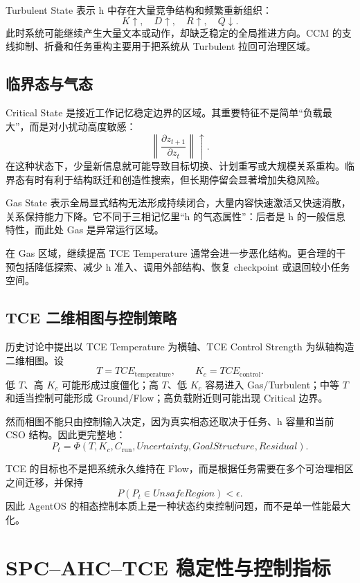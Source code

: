 Turbulent State 表示 h 中存在大量竞争结构和频繁重新组织：
\[
K\uparrow,\quad
D\uparrow,\quad
R\uparrow,\quad
Q\downarrow.
\]
此时系统可能继续产生大量文本或动作，却缺乏稳定的全局推进方向。CCM 的支线抑制、折叠和任务重构主要用于把系统从 Turbulent 拉回可治理区域。

\section{临界态与气态}

Critical State 是接近工作记忆稳定边界的区域。其重要特征不是简单“负载最大”，而是对小扰动高度敏感：
\[
\left\|
\frac{\partial z_{t+1}}
{\partial z_t}
\right\|
\uparrow.
\]
在这种状态下，少量新信息就可能导致目标切换、计划重写或大规模关系重构。临界态有时有利于结构跃迁和创造性搜索，但长期停留会显著增加失稳风险。

Gas State 表示全局显式结构无法形成持续闭合，大量内容快速激活又快速消散，关系保持能力下降。它不同于三相记忆里“h 的气态属性”：后者是 h 的一般信息特性，而此处 Gas 是异常运行区域。

在 Gas 区域，继续提高 TCE Temperature 通常会进一步恶化结构。更合理的干预包括降低探索、减少 h 准入、调用外部结构、恢复 checkpoint 或退回较小任务空间。

\section{TCE 二维相图与控制策略}

历史讨论中提出以 TCE Temperature 为横轴、TCE Control Strength 为纵轴构造二维相图。设
\[
T=TCE_{\mathrm{temperature}},
\qquad
K_c=TCE_{\mathrm{control}}.
\]
低 $T$、高 $K_c$ 可能形成过度僵化；高 $T$、低 $K_c$ 容易进入 Gas/Turbulent；中等 $T$ 和适当控制可能形成 Ground/Flow；高负载附近则可能出现 Critical 边界。

然而相图不能只由控制输入决定，因为真实相态还取决于任务、h 容量和当前 CSO 结构。因此更完整地：
\[
P_t
=
\Phi(
T,
K_c,
C_{\mathrm{run}},
Uncertainty,
GoalStructure,
Residual
).
\]

TCE 的目标也不是把系统永久维持在 Flow，而是根据任务需要在多个可治理相区之间迁移，并保持
\[
P(P_t\in UnsafeRegion)
<
\epsilon.
\]
因此 AgentOS 的相态控制本质上是一种状态约束控制问题，而不是单一性能最大化。


\chapter{SPC--AHC--TCE 稳定性与控制指标}
\label{app:stability}

